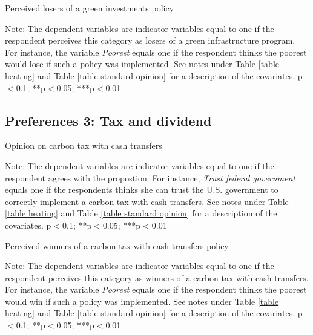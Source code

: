 \documentclass{article}
\begin{document}
\begin{table}[h!]
	\caption{Perceived losers of a green investments policy}
	\begin{center}
		\scalebox{0.7}{}
	\end{center}
	{\footnotesize Note: The dependent variables are indicator variables equal to one if the respondent perceives this category as losers of a green infrastructure program. For instance, the variable \textit{Poorest} equals one if the respondent thinks the poorest would lose if such a policy was implemented. See notes under Table \ref{table heating} and Table \ref{table standard opinion} for a description of the covariates.
	\newline *p$<$0.1; **p$<$0.05; ***p$<$0.01}
\end{table}	

\clearpage
\subsection{Preferences 3: Tax and dividend}

\begin{table}[h!]
	\caption{Opinion on carbon tax with cash transfers}
	\begin{center}
		\scalebox{0.7}{}
	\end{center}
	{\footnotesize Note: The dependent variables are indicator variables equal to one if the respondent agrees with the propostion. For instance, \textit{Trust federal government} equals one if the respondents thinks she can trust the U.S. government to correctly implement a carbon tax with cash transfers. See notes under Table \ref{table heating} and Table \ref{table standard opinion} for a description of the covariates.
	\newline *p$<$0.1; **p$<$0.05; ***p$<$0.01}
\end{table}	

\begin{table}[h!]
	\caption{Perceived winners of a carbon tax with cash transfers policy}
	\begin{center}
		\scalebox{0.7}{}
	\end{center}
	{\footnotesize Note: The dependent variables are indicator variables equal to one if the respondent perceives this category as winners of a carbon tax with cash transfers. For instance, the variable \textit{Poorest} equals one if the respondent thinks the poorest would win if such a policy was implemented. See notes under Table \ref{table heating} and Table \ref{table standard opinion} for a description of the covariates.
	\newline *p$<$0.1; **p$<$0.05; ***p$<$0.01}
\end{table}	
\end{document}
